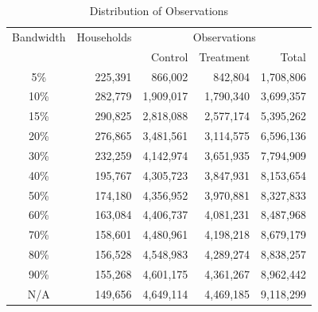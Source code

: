 \clearpage
\begin{table}
\centering
\caption{Distribution of Observations}
\label{Table:Distribution-of-Observations}
    \begin{tabular}{c|r|r|r||r}
        \hline
        \hline
        \hspace{0.3cm} Bandwidth \hspace{0.3cm} & Households & \multicolumn{3}{c}{Observations} \\
        \cline{3-5}
        & & Control & Treatment & Total \\
        \hline
        5\% & 225,391 & 866,002 & 842,804 & 1,708,806 \\
        \hline
        10\% & 282,779 & 1,909,017 & 1,790,340 & 3,699,357 \\
        \hline
        15\% & 290,825 & 2,818,088 & 2,577,174 & 5,395,262 \\
        \hline
        20\% & 276,865 & 3,481,561 & 3,114,575 & 6,596,136 \\
        \hline
        30\% & 232,259 & 4,142,974 & 3,651,935 & 7,794,909 \\
        \hline
        40\% & 195,767 & 4,305,723 & 3,847,931 & 8,153,654 \\
        \hline
        50\% & 174,180 & 4,356,952 & 3,970,881 & 8,327,833 \\
        \hline
        60\% & 163,084 & 4,406,737 & 4,081,231 & 8,487,968 \\
        \hline
        70\% & 158,601 & 4,480,961 & 4,198,218 & 8,679,179 \\
        \hline
        80\% & 156,528 & 4,548,983 & 4,289,274 & 8,838,257 \\
        \hline
        90\% & 155,268 & 4,601,175 & 4,361,267 & 8,962,442 \\
        \hline
        N/A & 149,656 & \hspace{0.3cm} 4,649,114 & \hspace{0.3cm} 4,469,185 & \hspace{0.3cm} 9,118,299  \\
        \hline
        \hline
    \end{tabular}
\end{table}


\clearpage
    

\clearpage


